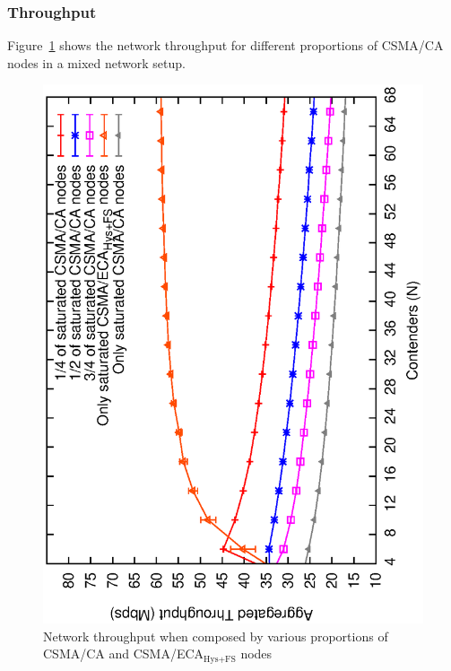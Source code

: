 \documentclass[a4paper,journal]{IEEEtran}
\begin{document}
	\subsubsection{Throughput}
	
	Figure~\ref{fig:mixedThroughput-sat} shows the network throughput for different proportions of CSMA/CA nodes in a mixed network setup.
	
	\begin{figure}[tb]
		\centering
		\includegraphics[width=0.7\linewidth,angle=-90]{figures/saturated/mixed/throughput-mixed/throughput-saturated-mixed.eps}
		\caption{Network throughput when composed by various proportions of CSMA/CA and CSMA/ECA$_{\text{Hys+FS}}$ nodes}
		\label{fig:mixedThroughput-sat}
	\end{figure}
	
\end{document}
